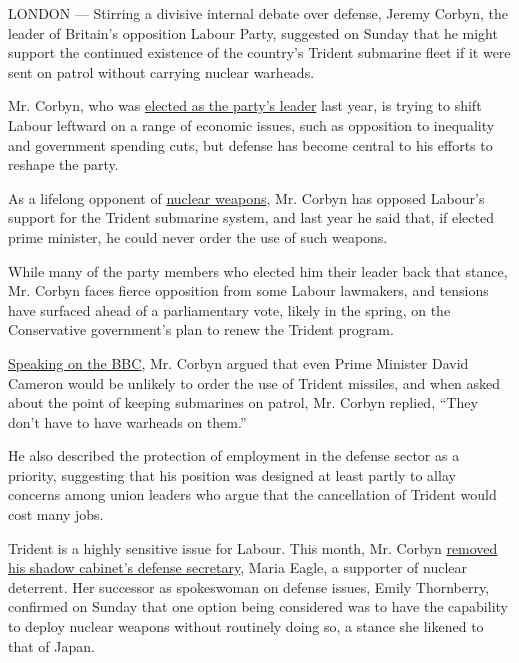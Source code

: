 LONDON --- Stirring a divisive internal debate over defense, Jeremy
Corbyn, the leader of Britain's opposition Labour Party, suggested on
Sunday that he might support the continued existence of the country's
Trident submarine fleet if it were sent on patrol without carrying
nuclear warheads.

Mr. Corbyn, who was
\href{http://www.nytimes.com/2015/09/13/world/europe/labour-party-election-jeremy-corbyn.html}{elected
as the party's leader} last year, is trying to shift Labour leftward on
a range of economic issues, such as opposition to inequality and
government spending cuts, but defense has become central to his efforts
to reshape the party.

As a lifelong opponent of
\href{http://topics.nytimes.com/top/news/science/topics/atomic_weapons/index.html?inline=nyt-classifier}{nuclear
weapons}, Mr. Corbyn has opposed Labour's support for the Trident
submarine system, and last year he said that, if elected prime minister,
he could never order the use of such weapons.

While many of the party members who elected him their leader back that
stance, Mr. Corbyn faces fierce opposition from some Labour lawmakers,
and tensions have surfaced ahead of a parliamentary vote, likely in the
spring, on the Conservative government's plan to renew the Trident
program.

\href{http://www.bbc.co.uk/programmes/p03fr07z}{Speaking on the BBC},
Mr. Corbyn argued that even Prime Minister David Cameron would be
unlikely to order the use of Trident missiles, and when asked about the
point of keeping submarines on patrol, Mr. Corbyn replied, ``They don't
have to have warheads on them.''

He also described the protection of employment in the defense sector as
a priority, suggesting that his position was designed at least partly to
allay concerns among union leaders who argue that the cancellation of
Trident would cost many jobs.

Trident is a highly sensitive issue for Labour. This month, Mr. Corbyn
\href{http://www.nytimes.com/2016/01/07/world/europe/jeremy-corbyn-british-labour-leader-finishes-shadow-cabinet-reorganization.html}{removed
his shadow cabinet's defense secretary}, Maria Eagle, a supporter of
nuclear deterrent. Her successor as spokeswoman on defense issues, Emily
Thornberry, confirmed on Sunday that one option being considered was to
have the capability to deploy nuclear weapons without routinely doing
so, a stance she likened to that of Japan.

